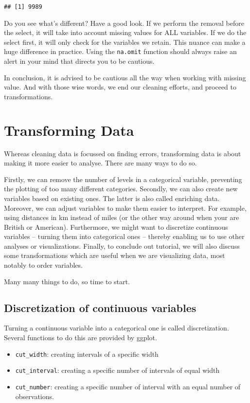 \documentclass[]{tufte-book}
\providecommand{\tightlist}{%
  \setlength{\itemsep}{0pt}\setlength{\parskip}{0pt}}
\begin{document}
\begin{verbatim}
## [1] 9989
\end{verbatim}

Do you see what's different? Have a good look. If we perform the removal
before the select, it will take into account missing values for ALL
variables. If we do the select first, it will only check for the
variables we retain. This nuance can make a huge difference in practice.
Using the \texttt{na.omit} function should always raise an alert in your
mind that directs you to be cautious.

In conclusion, it is advised to be cautious all the way when working
with missing value. And with those wise words, we end our cleaning
efforts, and proceed to transformations.

\chapter{Transforming Data}\label{transforming-data}

Whereas cleaning data is focussed on finding errors, transforming data
is about making it more easier to analyse. There are many ways to do so.

Firstly, we can remove the number of levels in a categorical variable,
preventing the plotting of too many different categories. Secondly, we
can also create new variables based on existing ones. The latter is also
called enriching data. Moreover, we can adjust variables to make them
easier to interpret. For example, using distances in km instead of miles
(or the other way around when your are British or American).
Furthermore, we might want to discretize continuous variables -- turning
them into categorical ones -- thereby enabling us to use other analyses
or visualizations. Finally, to conclude out tutorial, we will also
discuss some transformations which are useful when we are visualizing
data, most notably to order variables.

Many many things to do, so time to start.

\section{Discretization of continuous
variables}\label{discretization-of-continuous-variables}

Turning a continuous variable into a categorical one is called
discretization. Several functions to do this are provided by ggplot.

\begin{itemize}
\tightlist
\item
  \texttt{cut\_width}: creating intervals of a specific width
\item
  \texttt{cut\_interval}: creating a specific number of intervals of
  equal width
\item
  \texttt{cut\_number}: creating a specific number of interval with an
  equal number of observations.
\end{itemize}
\end{document}
